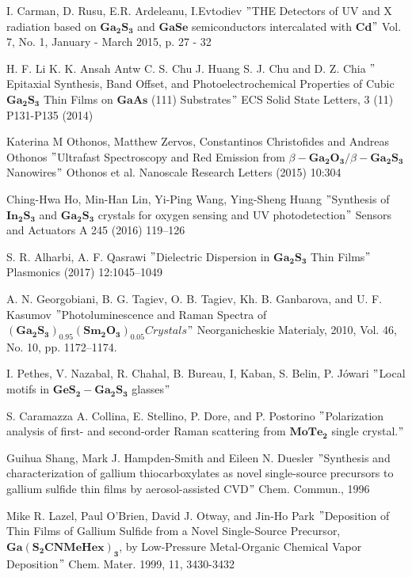 \begin{thebibliography}{}
	 I. Carman, D. Rusu, E.R. Ardeleanu, I.Evtodiev $"$THE Detectors of UV and X radiation based on $\mathbf{Ga_{2}S_{3}}$ and $\mathbf{GaSe}$ semiconductors intercalated with $\mathbf{Cd}$$"$ Vol. 7, No. 1, January - March 2015, p. 27 - 32
	
	 H. F. Li K. K. Ansah Antw C. S. Chu J. Huang S. J. Chu and D. Z. Chia $"$Epitaxial Synthesis, Band Offset, and Photoelectrochemical
	Properties of Cubic $\mathbf{Ga_{2}S_{3}}$ Thin Films on $\mathbf{GaAs}$ (111) Substrates$"$ ECS Solid State Letters, 3 (11) P131-P135 (2014)
	 
	 Katerina M Othonos, Matthew Zervos, Constantinos Christofides and Andreas Othonos $"$Ultrafast Spectroscopy and Red Emission
	from $\beta-\mathbf{Ga_{2}O_{3}}/ \beta-\mathbf{Ga_{2}S_{3}}$ Nanowires$"$ Othonos et al. Nanoscale Research Letters (2015) 10:304
	
	 Ching-Hwa Ho, Min-Han Lin, Yi-Ping Wang, Ying-Sheng Huang $"$Synthesis of $\mathbf{In_{2}S_{3}}$ and $\mathbf{Ga_{2}S_{3}}$ crystals for oxygen sensing and UV photodetection$"$ Sensors and Actuators A 245 (2016) 119–126
	
	 S. R. Alharbi, A. F. Qasrawi $"$Dielectric Dispersion in $\mathbf{Ga_{2}S_{3}}$ Thin Films$"$ Plasmonics (2017) 12:1045–1049
	
	 A. N. Georgobiani, B. G. Tagiev, O. B. Tagiev, Kh. B. Ganbarova, and U. F. Kasumov $"$Photoluminescence and Raman Spectra of $\mathbf{(Ga_{2}S_{3})_{0.95}(Sm_{2}O_{3})_{0.05}} Crystals$$"$ Neorganicheskie Materialy, 2010, Vol. 46, No. 10, pp. 1172–1174.
	
	 I. Pethes, V. Nazabal, R. Chahal, B. Bureau, I, Kaban, S. Belin, P. Jówari $"$Local motifs in $\mathbf{GeS_{2}-Ga_{2}S_{3}}$ glasses$"$
	
	 S. Caramazza A. Collina, E. Stellino, P. Dore, and P. Postorino $"$Polarization analysis of first- and second-order Raman scattering from $\mathbf{MoTe_{2}}$ single crystal.$"$
	
	 Guihua Shang, Mark J. Hampden-Smith and Eileen N. Duesler $"$Synthesis and characterization of gallium thiocarboxylates as novel single-source precursors to gallium sulfide thin films by aerosol-assisted CVD$"$ Chem. Commun., 1996
	
	 Mike R. Lazel, Paul O’Brien, David J. Otway, and Jin-Ho Park $"$Deposition of Thin Films of Gallium Sulfide from a Novel Single-Source
	Precursor, $\mathbf{Ga(S_{2}CNMeHex)_{3}}$, by Low-Pressure Metal-Organic Chemical Vapor Deposition$"$ Chem. Mater. 1999, 11, 3430-3432
	

\end{thebibliography}
